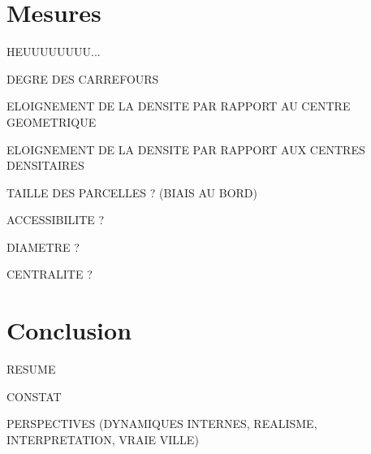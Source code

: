 \documentclass[12pt]{article}
\begin{document}
\section{Mesures}

HEUUUUUUUU...

DEGRE DES CARREFOURS

ELOIGNEMENT DE LA DENSITE PAR RAPPORT AU CENTRE GEOMETRIQUE

ELOIGNEMENT DE LA DENSITE PAR RAPPORT AUX CENTRES DENSITAIRES

TAILLE DES PARCELLES ? (BIAIS AU BORD)

ACCESSIBILITE ?

DIAMETRE ?

CENTRALITE ?

\section{Conclusion}

RESUME

CONSTAT

PERSPECTIVES (DYNAMIQUES INTERNES, REALISME, INTERPRETATION, VRAIE VILLE)

\printbibliography
\end{document}
